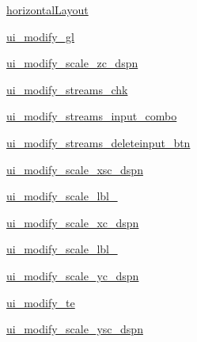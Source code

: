 \begin{DoxyCompactItemize}
\item 
\hyperlink{classbladepro__modules_1_1inputfile__writer_u_i_1_1_ui___main_window_a26736563b6a21e18aa6259ad090095f6}{horizontal\+Layout}
\item 
\hyperlink{classbladepro__modules_1_1inputfile__writer_u_i_1_1_ui___main_window_adbd7e377be21c4d3b65945e822f6d16a}{ui\+\_\+modify\+\_\+gl}
\item 
\hyperlink{classbladepro__modules_1_1inputfile__writer_u_i_1_1_ui___main_window_a45676686abc65792ca2563bc755bf1fc}{ui\+\_\+modify\+\_\+scale\+\_\+zc\+\_\+dspn}
\item 
\hyperlink{classbladepro__modules_1_1inputfile__writer_u_i_1_1_ui___main_window_a6d932026d0608e9101dc635e53e14b39}{ui\+\_\+modify\+\_\+streams\+\_\+chk}
\item 
\hyperlink{classbladepro__modules_1_1inputfile__writer_u_i_1_1_ui___main_window_aa5c75d1179f2057b2870faeb125ba159}{ui\+\_\+modify\+\_\+streams\+\_\+input\+\_\+combo}
\item 
\hyperlink{classbladepro__modules_1_1inputfile__writer_u_i_1_1_ui___main_window_a975e1c1c7915c37fc9a24064f29b0ba6}{ui\+\_\+modify\+\_\+streams\+\_\+deleteinput\+\_\+btn}
\item 
\hyperlink{classbladepro__modules_1_1inputfile__writer_u_i_1_1_ui___main_window_a8a7176b6c27c85fb33c76775294b0b80}{ui\+\_\+modify\+\_\+scale\+\_\+xsc\+\_\+dspn}
\item 
\hyperlink{classbladepro__modules_1_1inputfile__writer_u_i_1_1_ui___main_window_a86a79f9b08cfaf52544470b8392b2978}{ui\+\_\+modify\+\_\+scale\+\_\+lbl\+\_}
\item 
\hyperlink{classbladepro__modules_1_1inputfile__writer_u_i_1_1_ui___main_window_ae36e5bd681ee713671843137c9328bc6}{ui\+\_\+modify\+\_\+scale\+\_\+xc\+\_\+dspn}
\item 
\hyperlink{classbladepro__modules_1_1inputfile__writer_u_i_1_1_ui___main_window_a69a6abf1b7b08db89a7a0f640590d037}{ui\+\_\+modify\+\_\+scale\+\_\+lbl\+\_}
\item 
\hyperlink{classbladepro__modules_1_1inputfile__writer_u_i_1_1_ui___main_window_a66b3b327058352a8f531970b3e41bf6f}{ui\+\_\+modify\+\_\+scale\+\_\+yc\+\_\+dspn}
\item 
\hyperlink{classbladepro__modules_1_1inputfile__writer_u_i_1_1_ui___main_window_aefc951ed87303c4d5f2a3c5801b17441}{ui\+\_\+modify\+\_\+te}
\item 
\hyperlink{classbladepro__modules_1_1inputfile__writer_u_i_1_1_ui___main_window_a537018812c327e8613e8e2cbb8923210}{ui\+\_\+modify\+\_\+scale\+\_\+ysc\+\_\+dspn}

\end{DoxyCompactItemize}
